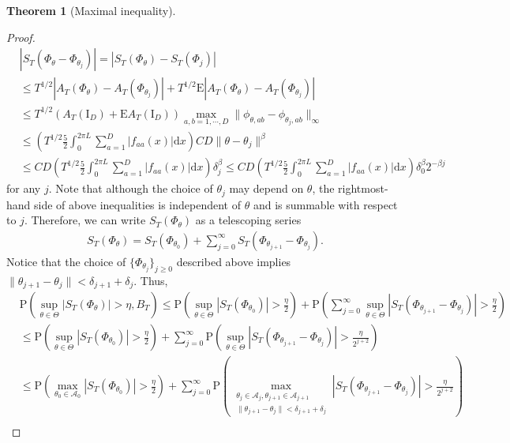 \documentclass[11pt]{article}
\numberwithin{equation}{section}
\theoremstyle{plain}
\theoremstyle{definition}
\theoremstyle{definition}
\theoremstyle{assumption}
\theoremstyle{proposition}
\theoremstyle{proposition}
\theoremstyle{example}
\theoremstyle{lemma}
\theoremstyle{theorem}
\newtheorem{theorem}{Theorem}[section]
\theoremstyle{remark}
\begin{document}
\begin{theorem}[Maximal inequality]
\begin{proof}
\begin{align*}
&|S_T(\Phi_{\theta} - \Phi_{\theta_j})|
=|S_T(\Phi_{\theta}) - S_T(\Phi_j)| \\
&\leqslant T^{1/2} |A_T(\Phi_{\theta}) - A_T(\Phi_{\theta_j})| + T^{1/2} \mathrm{E}|A_T(\Phi_{\theta}) - A_T(\Phi_{\theta_j})| \\
&\leqslant T^{1/2}(A_T(\boldsymbol{\mathrm{I}}_{D}) + \mathrm{E}A_T(\boldsymbol{\mathrm{I}}_{D}))\max_{a,b=1,\cdots,D}\|\phi_{\theta, ab} - \phi_{\theta_j, ab}\|_{\infty} \\
&\leqslant \left(T^{1/2} \frac{5}{2}\int_{0}^{2\pi L} \sum_{a=1}^{D}|f_{aa}(x)|\mathrm{d}x \right)CD\|\theta - \theta_j\|^{\beta} \\
& \leqslant CD \left(T^{1/2} \frac{5}{2}\int_{0}^{2\pi L} \sum_{a=1}^{D}|f_{aa}(x)|\mathrm{d}x \right)\delta_j^{\beta}
\leqslant CD \left(T^{1/2} \frac{5}{2}\int_{0}^{2\pi L} \sum_{a=1}^{D}|f_{aa}(x)|\mathrm{d}x \right)\delta_0^{\beta} 2^{-\beta j}
\end{align*}
for any $j$. Note that although the choice of $\theta_j$ may depend on $\theta$, the rightmost-hand side of above inequalities is independent of $\theta$ and is summable with respect to $j$. Therefore, we can write $S_T(\Phi_{\theta})$ as a telescoping series
\begin{align*}
S_T(\Phi_{\theta}) = S_T(\Phi_{\theta_0}) + \sum_{j=0}^{\infty} S_T(\Phi_{\theta_{j+1}} - \Phi_{\theta_j}).
\end{align*}
Notice that the choice of $\{\Phi_{\theta_j}\}_{j\geqslant0}$ described above implies $\|\theta_{j+1} - \theta_j\|< \delta_{j+1} + \delta_j$. Thus,
\begin{align*}
&\mathrm{P}\left(\sup_{\theta\in\Theta}|S_T(\Phi_{\theta})|>\eta, B_T\right)
\leqslant \mathrm{P}\left(\sup_{\theta\in\Theta}|S_T(\Phi_{\theta_0})|>\frac{\eta}{2}\right) + \mathrm{P}\left(\sum_{j=0}^{\infty}\sup_{\theta\in\Theta}\left| S_T(\Phi_{\theta_{j+1}} - \Phi_{\theta_j})\right|>\frac{\eta}{2}\right) \\
&\leqslant \mathrm{P}\left(\sup_{\theta\in\Theta}|S_T(\Phi_{\theta_0})|>\frac{\eta}{2}\right) + \sum_{j=0}^{\infty}\mathrm{P}\left(\sup_{\theta\in\Theta}\left| S_T(\Phi_{\theta_{j+1}} - \Phi_{\theta_j})\right|>\frac{\eta}{2^{j+2}}\right) \\
&\leqslant \mathrm{P}\left(\max_{\theta_0\in\mathcal{A}_0}|S_T(\Phi_{\theta_0})|>\frac{\eta}{2}\right) + \sum_{j=0}^{\infty}\mathrm{P}\left(\max_{\substack{\theta_j\in\mathcal{A}_j, \theta_{j+1}\in\mathcal{A}_{j+1} \\ \|\theta_{j+1} - \theta_j\|< \delta_{j+1} + \delta_j}}\left| S_T(\Phi_{\theta_{j+1}} - \Phi_{\theta_j})\right|>\frac{\eta}{2^{j+2}}\right) \\

\end{align*}
\end{proof}
\end{theorem}
\end{document}
